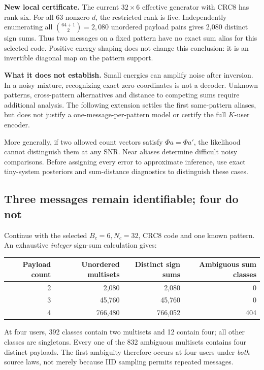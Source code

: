 \documentclass[10pt,a4paper]{article}
\begin{document}
\textbf{New local certificate.} The current $32\times6$ effective generator with CRC8 has rank six.
For all 63 nonzero $d$, the restricted rank is five. Independently enumerating all
$\binom{64+1}{2}=2{,}080$ unordered payload pairs gives 2,080 distinct sign sums.
Thus two messages on a fixed pattern have no exact sum alias for this selected code. Positive energy shaping
does not change this conclusion: it is an invertible diagonal map on the pattern support.

\textbf{What it does not establish.} Small energies can amplify noise after inversion. In a noisy mixture,
recognizing exact zero coordinates is not a decoder. Unknown patterns, cross-pattern alternatives and distance
to competing sums require additional analysis. The following extension settles the first same-pattern aliases,
but does not justify a one-message-per-pattern model or certify the full $K$-user encoder.

More generally, if two allowed count vectors satisfy $\Phi a=\Phi a'$, the likelihood cannot distinguish them at
any SNR. Near aliases determine difficult noisy comparisons. Before assigning every error to approximate inference,
use exact tiny-system posteriors and sum-distance diagnostics to distinguish these cases.

\clearpage
\subsection{Three messages remain identifiable; four do not}
Continue with the selected $B_c=6,N_c=32$, CRC8 code and one known pattern.
An exhaustive \emph{integer} sign-sum calculation gives:
\begin{center}
\begin{tabular}{@{}rrrr@{}}\toprule
Payload count & Unordered multisets & Distinct sign sums & Ambiguous sum classes\\\midrule
2 & 2,080 & 2,080 & 0\\
3 & 45,760 & 45,760 & 0\\
4 & 766,480 & 766,052 & 404\\\bottomrule
\end{tabular}
\end{center}
At four users, 392 classes contain two multisets and 12 contain four; all other classes are singletons.
Every one of the 832 ambiguous multisets contains four distinct payloads. The first ambiguity therefore occurs
at four users under \emph{both} source laws, not merely because IID sampling permits repeated messages.
\end{document}
